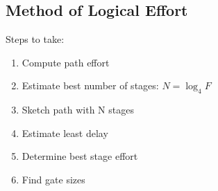 \subsection{Method of Logical Effort}
Steps to take:
\begin{enumerate}
    \item Compute path effort
    \item Estimate best number of stages: $N = \log_4F$
    \item Sketch path with N stages
    \item Estimate least delay
    \item Determine best stage effort
    \item Find gate sizes
\end{enumerate}